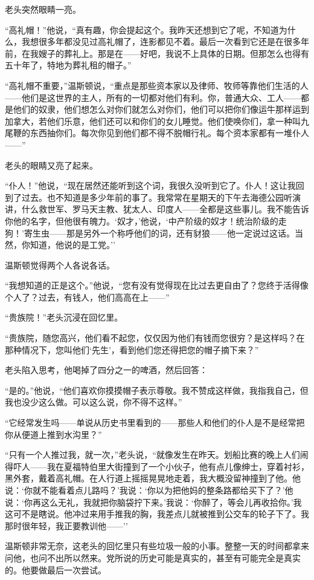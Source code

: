 老头突然眼睛一亮。

``高礼帽！''他说，``真有趣，你会提起这个。我昨天还想到它了呢，不知道为什么，我想很多年都没见过高礼帽了，连影都见不着。最后一次看到它还是在很多年前，在我嫂子的葬礼上。那是在——好吧，我说不上具体的日期。但那怎么也得有五十年了，特地为葬礼租的帽子。''

``高礼帽不重要，''温斯顿说，``重点是那些资本家以及律师、牧师等靠他们生活的人——他们是这世界的主人，所有的一切都对他们有利。你，普通大众、工人——都是他们的奴隶，他们想怎么对你们就怎么对你们，他们可以把你们像运牛那样运到加拿大，若他们乐意，他们还可以和你们的女儿睡觉。他们使唤你们，拿一种叫九尾鞭的东西抽你们。每次你见到他们都不得不脱帽行礼。每个资本家都有一堆仆人——''

老头的眼睛又亮了起来。

``仆人！''他说，``现在居然还能听到这个词，我很久没听到它了。仆人！这让我回到了过去。也不知道是多少年前的事了。我常常在星期天的下午去海德公园听演讲，什么救世军、罗马天主教、犹太人、印度人——全都是这些事儿。我不能告诉你他的名字，但他很有魄力。`奴才，'他说，`中产阶级的奴才！统治阶级的走狗！'寄生虫——那是另外一个称呼他们的词，还有豺狼——他一定说过这话。当然，你知道，他说的是工党。''

温斯顿觉得两个人各说各话。

``我想知道的正是这个。''他说，``您有没有觉得现在比过去更自由了？您终于活得像个人了？过去，有钱人，他们高高在上——''

``贵族院！''老头沉浸在回忆里。

``贵族院，随您高兴，他们看不起您，仅仅因为他们有钱而您很穷？是这样吗？在那种情况下，您叫他们`先生'，看到他们您还得把您的帽子摘下来？''

老头陷入思考，他喝掉了四分之一的啤酒，然后回答：

``是的。''他说，``他们喜欢你摸摸帽子表示尊敬。我不赞成这样做，我指我自己，但我也没少这么做。可以这么说，你不得不这样。''

``它经常发生吗——单说从历史书里看到的——那些人和他们的仆人是不是经常把你从便道上推到水沟里？''

``只有一个人推过我，就一次，''老头说，``就像发生在昨天。划船比赛的晚上人们闹得吓人——我在夏福特伯里大街撞到了一个小伙子，他有点儿像绅士，穿着衬衫，黑外套，戴着高礼帽。在人行道上摇摇晃晃地走着，我大概没留神撞到了他。他说：`你就不能看着点儿路吗？'我说：`你以为把他妈的整条路都给买下了？'他说：`你再这么无礼，我就把你脑袋拧下来。'我说：`你醉了，等会儿再收拾你。'我这可不是瞎说。他冲过来用手推我的胸，我差点儿就被推到公交车的轮子下了。我那时很年轻，我正要教训他——''

温斯顿非常无奈，这老头的回忆里只有些垃圾一般的小事。整整一天的时间都拿来问他，也问不出所以然来。党所说的历史可能是真实的，甚至有可能完全是真实的。他要做最后一次尝试。

